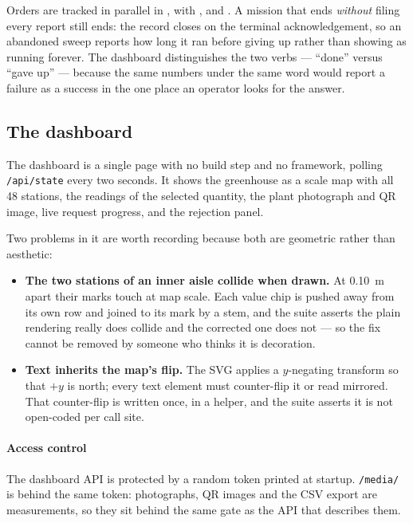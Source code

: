 Orders are tracked in parallel in , with
,  and . A
mission that ends \emph{without} filing every report still ends: the
record closes on the terminal acknowledgement, so an abandoned sweep
reports how long it ran before giving up rather than showing as running
forever. The dashboard distinguishes the two verbs --- ``done'' versus
``gave up'' --- because the same numbers under the same word would
report a failure as a success in the one place an operator looks for the
answer.

\subsection{The dashboard}

The dashboard is a single page with no build step and no framework,
polling \texttt{/api/state} every two seconds. It shows the greenhouse
as a scale map with all 48 stations, the readings of the selected
quantity, the plant photograph and QR image, live request progress, and
the rejection panel.

Two problems in it are worth recording because both are geometric rather
than aesthetic:

\begin{itemize}[leftmargin=*,itemsep=1pt,topsep=2pt]
  \item \textbf{The two stations of an inner aisle collide when drawn.}
        At \SI{0.10}{m} apart their marks touch at map scale. Each value
        chip is pushed away from its own row and joined to its mark by a
        stem, and the suite asserts the plain rendering really does
        collide and the corrected one does not --- so the fix cannot be
        removed by someone who thinks it is decoration.
  \item \textbf{Text inherits the map's flip.} The SVG applies a
        $y$-negating transform so that $+y$ is north; every text element
        must counter-flip it or read mirrored. That counter-flip is
        written once, in a helper, and the suite asserts it is not
        open-coded per call site.
\end{itemize}

\paragraph{Access control} The dashboard API is protected by a random
token printed at startup. \texttt{/media/} is behind the same token:
photographs, QR images and the CSV export are measurements, so they sit
behind the same gate as the API that describes them.

